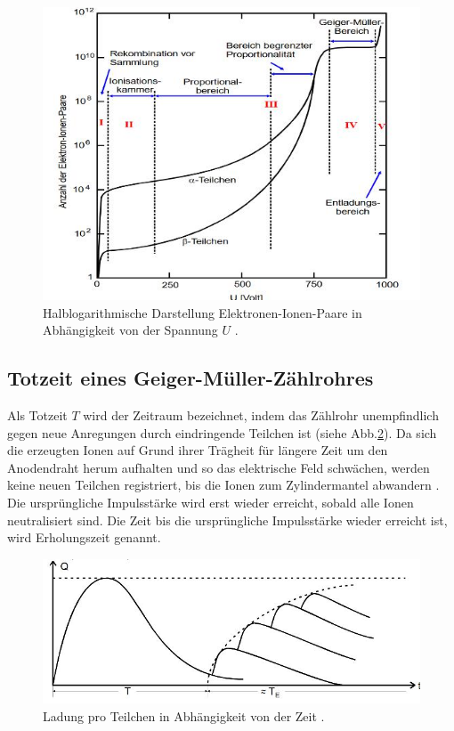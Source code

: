 \begin{figure}
\centering
\includegraphics[scale=0.5]{content/images/AU.jpg}
\caption{Halblogarithmische Darstellung Elektronen-Ionen-Paare in Abhängigkeit von der Spannung $U$ \cite{V703}.}
\label{fig:AU}
\end{figure}

\subsection{Totzeit eines Geiger-Müller-Zählrohres}
Als Totzeit $T$ wird der Zeitraum bezeichnet, indem das Zählrohr unempfindlich gegen neue Anregungen durch eindringende Teilchen ist (siehe Abb.\ref{fig:TZ}).
Da sich die erzeugten Ionen auf Grund ihrer Trägheit für längere Zeit um den Anodendraht herum aufhalten und so das elektrische Feld schwächen, werden keine neuen Teilchen registriert, bis die Ionen zum Zylindermantel abwandern \cite{V703}. Die ursprüngliche Impulsstärke wird erst wieder erreicht, sobald alle Ionen neutralisiert sind. Die Zeit bis die ursprüngliche Impulsstärke wieder erreicht ist, wird Erholungszeit genannt.

\begin{figure}
\centering
\includegraphics[scale=0.5]{content/images/T.jpg}
\caption{Ladung pro Teilchen in Abhängigkeit von der Zeit \cite{V703}.}
\label{fig:TZ}
\end{figure}


